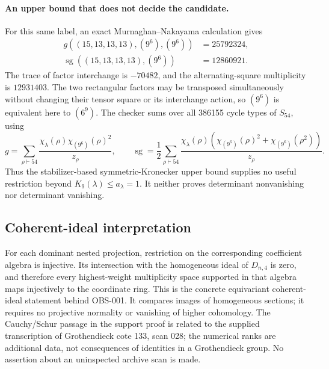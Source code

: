 \paragraph{An upper bound that does not decide the candidate.}
For this same label, an exact Murnaghan--Nakayama calculation gives
\[
\begin{split}
g((15,13,13,13),(9^6),(9^6))&=25792324,\\
\operatorname{sg}((15,13,13,13),(9^6))&=12860921.
\end{split}
\]
The trace of factor interchange is $-70482$, and the alternating-square
multiplicity is $12931403$. The two rectangular factors may be transposed
simultaneously without changing their tensor square or its interchange
action, so $(9^6)$ is equivalent here to $(6^9)$.
The checker sums over all 386155 cycle types of $S_{54}$, using
\[
g=\sum_{\rho\vdash54}\frac{\chi_\lambda(\rho)\chi_{(9^6)}(\rho)^2}{z_\rho},
\qquad
\operatorname{sg}=\frac12\sum_{\rho\vdash54}
 \frac{\chi_\lambda(\rho)(\chi_{(9^6)}(\rho)^2+
                  \chi_{(9^6)}(\rho^2))}{z_\rho}.
\]
Thus the stabilizer-based symmetric-Kronecker upper bound supplies no
useful restriction beyond $K_9(\lambda)\le a_\lambda=1$.
It neither proves determinant nonvanishing nor determinant vanishing.

\subsection{Coherent-ideal interpretation}
For each dominant nested projection, restriction on the corresponding
coefficient algebra is injective. Its intersection with the homogeneous
ideal of $D_{n,4}$ is zero, and therefore every highest-weight
multiplicity space supported in that algebra maps injectively to the
coordinate ring. This is the concrete equivariant coherent-ideal
statement behind OBS-001. It compares images of homogeneous sections;
it requires no projective normality or vanishing of higher cohomology.
The Cauchy/Schur passage in the support proof is related to the supplied
transcription of Grothendieck cote 133, scan 028; the numerical ranks
are additional data, not consequences of identities in a Grothendieck
group. No assertion about an uninspected archive scan is made.
